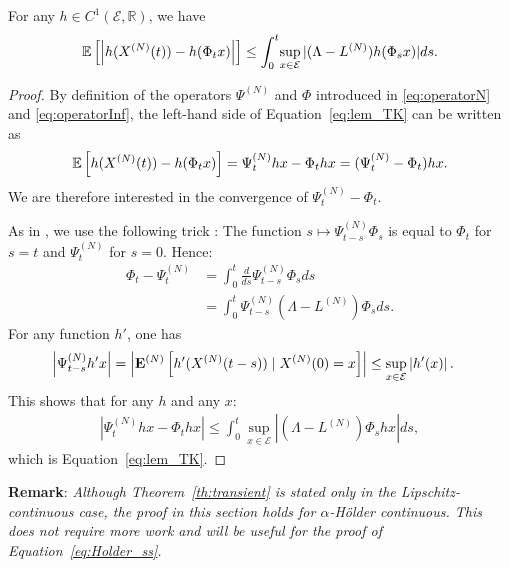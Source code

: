 \documentclass[sigconf]{acmart}
\newcommand\XN{X^{(N)}}
\newcommand\LN{L^{(N)}}
\newcommand\PsiN{\Psi^{(N)}}
\newcommand\E{\mathcal{E}}
\newcommand\R{\mathbb{R}}
\newcommand\esp[1]{{\mathchoice{\besp{#1}}{\sesp{#1}}{\sesp{#1}}{\sesp{#1}}}}
\newcommand\besp[1]{\mathbb{E}\left[#1\right]}
\newcommand\sesp[1]{\mathbb{E}[#1]}
\newcommand\espN[1]{{\mathchoice{\bespN{#1}}{\sespN{#1}}{\sespN{#1}}{\sespN{#1}}}}
\newcommand\bespN[1]{\mathbf{E}^{(N)}\left[#1\right]}
\newcommand\sespN[1]{\mathbf{E}^{(N)}[#1]}
\newcommand\abs[1]{\left|#1\right|}
\begin{document}
\begin{lemma}
  \label{lem:trotter-kurtz}
  For any $h\in C^{1}(\E,\R)$, we have
  \begin{align}
    \esp{\abs{h(\XN(t))-h(\Phi_tx)}} \le
    \int_0^t\!\sup_{x\in\E}|(\Lambda-\LN)h(\Phi_sx)|ds.
    \label{eq:lem_TK}
  \end{align}
\end{lemma}
\begin{proof}
  By definition of the operators $\PsiN$ and $\Phi$ introduced in
  \eqref{eq:operatorN} and \eqref{eq:operatorInf}, the left-hand side
  of Equation~\eqref{eq:lem_TK} can be written as
  \begin{align*}
    \esp{h(\XN(t))-h(\Phi_tx)} = \PsiN_thx-\Phi_thx =
    (\PsiN_t-\Phi_t)hx. 
  \end{align*}
  We are therefore interested in the convergence of
  $\PsiN_t-\Phi_t$. 

  As in \cite[Theorem~1]{kolokoltsov2011mean}, we use the following
  trick : The function $s\mapsto\PsiN_{t-s}\Phi_s$ is equal to
  $\Phi_t$ for $s=t$ and $\PsiN_t$ for $s=0$.  Hence:
  \begin{align}
    \Phi_t - \PsiN_t  &= \int_0^t \frac{d}{ds} \PsiN_{t-s}\Phi_s ds\nonumber\\
                       &=\int_0^t \PsiN_{t-s}(\Lambda-\LN)\Phi_sds. 
  \end{align}
  For any function $h'$, one has
  \begin{align*}
    \abs{\PsiN_{t-s}h'x} &= \abs{\espN{h'(\XN(t-s))\mid \XN(0)=x}}
                         \le\sup_{x\in\E} \abs{h'(x)}. 
  \end{align*}
  This shows that for any $h$ and any $x$: 
  \begin{align*}
    \abs{\PsiN_thx -  \Phi_thx} \le \int_0^t\sup_{x\in\E}
    \abs{(\Lambda-\LN)\Phi_shx}ds,
  \end{align*}
  which is Equation~\eqref{eq:lem_TK}. 
  \end{proof}


\textbf{Remark}: \emph{ Although Theorem~\ref{th:transient} is stated
  only in the Lipschitz-continuous case, the proof in this section
  holds for $\alpha$-Hölder continuous. This does not require more
  work and will be useful for the proof of
  Equation~\eqref{eq:Holder_ss}.}
\end{document}
